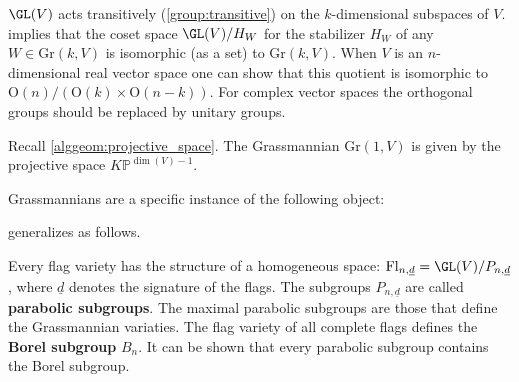     \begin{property}\label{linalgebra:grassmannian_construction}
        $\GL(V)$ acts transitively (\cref{group:transitive}) on the $k$-dimensional subspaces of $V$.  implies that the coset space $\GL(V)/H_W$ for the stabilizer $H_W$ of any $W\in\mathrm{Gr}(k,V)$ is isomorphic (as a set) to $\mathrm{Gr}(k,V)$. When $V$ is an $n$-dimensional real vector space one can show that this quotient is isomorphic to $\mathrm{O}(n)/(\mathrm{O}(k)\times\mathrm{O}(n-k))$. For complex vector spaces the orthogonal groups should be replaced by unitary groups.
    \end{property}

    \begin{example}
        Recall \cref{alggeom:projective_space}. The Grassmannian $\mathrm{Gr}(1,V)$ is given by the projective space $K\mathbb{P}^{\dim(V)-1}$.
    \end{example}


    Grassmannians are a specific instance of the following object:

     generalizes as follows.
    \begin{property}
        Every flag variety has the structure of a homogeneous space: $\mathrm{Fl}_{n,\underline{d}}=\GL(V)/P_{n,\underline{d}}$, where $\underline{d}$ denotes the signature of the flags. The subgroups $P_{n,\underline{d}}$ are called \textbf{parabolic subgroups}. The maximal parabolic subgroups are those that define the Grassmannian variaties. The flag variety of all complete flags defines the \textbf{Borel subgroup} $B_n$. It can be shown that every parabolic subgroup contains the Borel subgroup.
    \end{property}